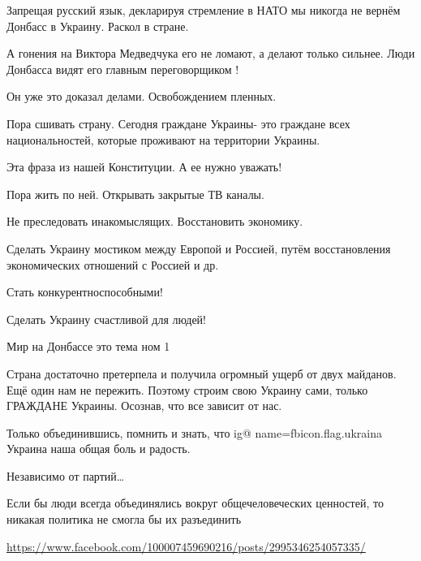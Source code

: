 Запрещая русский язык, декларируя стремление в НАТО мы никогда не вернём
Донбасс в Украину. Раскол в стране.

А гонения на Виктора Медведчука его не ломают, а делают только сильнее. Люди
Донбасса видят его главным переговорщиком ! 

Он уже  это доказал делами. Освобождением пленных. 

Пора сшивать страну. Сегодня граждане Украины- это граждане всех
национальностей, которые проживают на территории Украины. 

Эта фраза из нашей Конституции. А ее нужно уважать!  

Пора жить по ней. Открывать закрытые ТВ каналы. 

Не преследовать инакомыслящих. Восстановить экономику. 

Сделать Украину мостиком между Европой и Россией, путём восстановления
экономических отношений с Россией и др. 

Стать конкурентноспособными! 

Сделать Украину счастливой для людей! 

Мир на Донбассе это тема ном 1

Страна достаточно претерпела и получила огромный ущерб от двух майданов. Ещё
один нам не пережить.  Поэтому строим свою Украину сами, только ГРАЖДАНЕ
Украины. Осознав, что все зависит от нас. 

Только объединившись,  помнить и знать, что
\ifcmt
  ig@ name=fbicon.flag.ukraina
\fi
Украина наша общая боль и радость.

Независимо от партий… 

Если бы люди всегда объединялись  вокруг общечеловеческих ценностей, то никакая
политика  не смогла бы их  разъединить

\url{https://www.facebook.com/100007459690216/posts/2995346254057335/}
